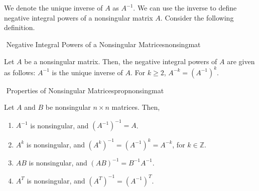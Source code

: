         \\
        \\
        We denote the unique inverse of \(A\) as \(A^{-1}\). We can use the inverse to define negative integral powers of a nonsingular matrix \(A\). Consider the following definition.
        \begin{definition}{\Stop\,\,Negative Integral Powers of a Nonsingular Matrices}{nonsingmat}

            Let \(A\) be a nonsingular matrix. Then, the negative integral powers of \(A\) are given as follows: \(A^{-1}\) is the unique inverse of \(A\). For \(k\geq2\), \(A^{-k}=(A^{-1})^k\).
            
        \end{definition}
        \begin{theorem}{\Stop\,\,Properties of Nonsingular Matrices}{propnonsingmat}

            Let \(A\) and \(B\) be nonsingular \(n\times n\) matrices. Then,
            \begin{enumerate}
                \item \(A^{-1}\) is nonsingular, and \((A^{-1})^{-1}=A\).
                \item \(A^k\) is nonsingular, and \((A^k)^{-1}=(A^{-1})^k=A^{-k}\), for \(k\in\mathbb{Z}\).
                \item \(AB\) is nonsingular, and \((AB)^{-1}=B^{-1}A^{-1}\).
                \item \(A^T\) is nonsingular, and \((A^T)^{-1}=(A^{-1})^T\).
            \end{enumerate}
            
        \end{theorem}